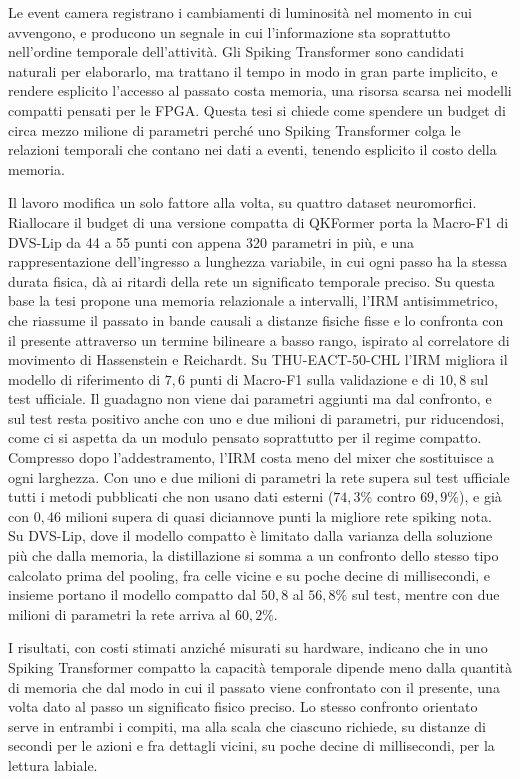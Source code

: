 Le event camera registrano i cambiamenti di luminosità nel momento in cui avvengono, e producono un segnale in cui l'informazione sta soprattutto nell'ordine temporale dell'attività. Gli Spiking Transformer sono candidati naturali per elaborarlo, ma trattano il tempo in modo in gran parte implicito, e rendere esplicito l'accesso al passato costa memoria, una risorsa scarsa nei modelli compatti pensati per le FPGA. Questa tesi si chiede come spendere un budget di circa mezzo milione di parametri perché uno Spiking Transformer colga le relazioni temporali che contano nei dati a eventi, tenendo esplicito il costo della memoria.

Il lavoro modifica un solo fattore alla volta, su quattro dataset neuromorfici. Riallocare il budget di una versione compatta di QKFormer porta la Macro-F1 di DVS-Lip da 44 a 55 punti con appena 320 parametri in più, e una rappresentazione dell'ingresso a lunghezza variabile, in cui ogni passo ha la stessa durata fisica, dà ai ritardi della rete un significato temporale preciso. Su questa base la tesi propone una memoria relazionale a intervalli, l'IRM antisimmetrico, che riassume il passato in bande causali a distanze fisiche fisse e lo confronta con il presente attraverso un termine bilineare a basso rango, ispirato al correlatore di movimento di Hassenstein e Reichardt. Su THU-EACT-50-CHL l'IRM migliora il modello di riferimento di $7{,}6$ punti di Macro-F1 sulla validazione e di $10{,}8$ sul test ufficiale. Il guadagno non viene dai parametri aggiunti ma dal confronto, e sul test resta positivo anche con uno e due milioni di parametri, pur riducendosi, come ci si aspetta da un modulo pensato soprattutto per il regime compatto. Compresso dopo l'addestramento, l'IRM costa meno del mixer che sostituisce a ogni larghezza. Con uno e due milioni di parametri la rete supera sul test ufficiale tutti i metodi pubblicati che non usano dati esterni ($74{,}3\%$ contro $69{,}9\%$), e già con $0{,}46$ milioni supera di quasi diciannove punti la migliore rete spiking nota. Su DVS-Lip, dove il modello compatto è limitato dalla varianza della soluzione più che dalla memoria, la distillazione si somma a un confronto dello stesso tipo calcolato prima del pooling, fra celle vicine e su poche decine di millisecondi, e insieme portano il modello compatto dal $50{,}8$ al $56{,}8\%$ sul test, mentre con due milioni di parametri la rete arriva al $60{,}2\%$.

I risultati, con costi stimati anziché misurati su hardware, indicano che in uno Spiking Transformer compatto la capacità temporale dipende meno dalla quantità di memoria che dal modo in cui il passato viene confrontato con il presente, una volta dato al passo un significato fisico preciso. Lo stesso confronto orientato serve in entrambi i compiti, ma alla scala che ciascuno richiede, su distanze di secondi per le azioni e fra dettagli vicini, su poche decine di millisecondi, per la lettura labiale.
